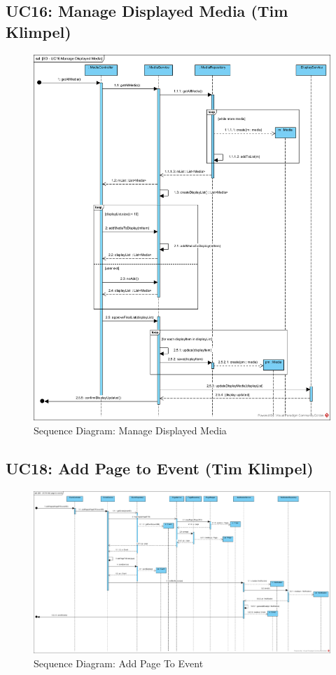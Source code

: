 \documentclass{article}
\begin{document}
\subsection{UC16: Manage Displayed Media (Tim Klimpel)}
\begin{figure}[H]
    \centering
    \includegraphics[width=.9\textwidth]{images/SD-UC16-ManageDisplayedMedia.png}
    \centering
    \caption{Sequence Diagram: Manage Displayed Media}
\end{figure}
\subsection{UC18: Add Page to Event (Tim Klimpel)}
\begin{figure}[H]
    \centering
    \includegraphics[width=.9\textwidth]{images/SD-UC18-AddPageToEvent.png}
    \centering
    \caption{Sequence Diagram: Add Page To Event}
\end{figure}
\end{document}
